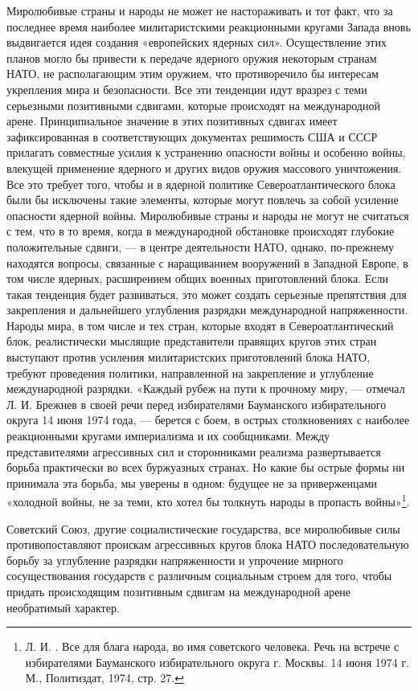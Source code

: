 \documentclass[12pt, a4paper, openany]{book}
\begin{document}
	Миролюбивые страны и народы не может не настораживать и тот факт, что за последнее время наиболее милитаристскими реакционными кругами Запада вновь выдвигается идея создания «европейских ядерных сил». Осуществление этих планов могло бы привести к передаче ядерного оружия некоторым странам НАТО, не располагающим этим оружием, что противоречило бы интересам укрепления мира и безопасности. Все эти тенденции идут вразрез с теми серьезными позитивными сдвигами, которые происходят на международной арене. Принципиальное значение в этих позитивных сдвигах имеет зафиксированная в соответствующих документах решимость США и СССР прилагать совместные усилия к устранению опасности войны и особенно войны, влекущей применение ядерного и других видов оружия массового уничтожения. Все это требует того, чтобы и в ядерной политике Североатлантического блока были бы исключены такие элементы, которые могут повлечь за собой усиление опасности ядерной войны. Миролюбивые страны и народы не могут не считаться с тем, что в то время, когда в международной обстановке происходят глубокие положительные сдвиги, — в центре деятельности НАТО, однако, по-прежнему находятся вопросы, связанные с наращиванием вооружений в Западной Европе, в том числе ядерных, расширением общих военных приготовлений блока. Если такая тенденция будет развиваться, это может создать серьезные препятствия для закрепления и дальнейшего углубления разрядки международной напряженности. Народы мира, в том числе и тех стран, которые входят в Североатлантический блок, реалистически мыслящие представители правящих кругов этих стран выступают против усиления милитаристских приготовлений блока НАТО, требуют проведения политики, направленной на закрепление и углубление международной разрядки. «Каждый рубеж на пути к прочному миру, — отмечал Л. И. Брежнев в своей речи перед избирателями Бауманского избирательного округа 14 июня 1974 года, — берется с боем, в острых столкновениях с наиболее реакционными кругами империализма и их сообщниками. Между представителями агрессивных сил и сторонниками реализма развертывается борьба практически во всех буржуазных странах. Но какие бы острые формы ни принимала эта борьба, мы уверены в одном: будущее не за приверженцами «холодной войны, не за теми, кто хотел бы толкнуть народы в пропасть войны»{\footnote{Л. И. . Все для блага народа, во имя советского человека. Речь на встрече с избирателями Бауманского избирательного округа г. Москвы. 14 июня 1974 г. М., Политиздат, 1974, стр. 27.}}.
	
	Советский Союз, другие социалистические государства, все миролюбивые силы противопоставляют проискам агрессивных кругов блока НАТО последовательную борьбу за углубление разрядки напряженности и упрочение мирного сосуществования государств с различным социальным строем для того, чтобы придать происходящим позитивным сдвигам на международной арене необратимый характер.
	
\end{document}
